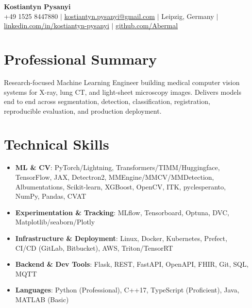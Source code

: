\documentclass[letterpaper,10pt]{article}
\newcommand{\resumeItem}[1]{
    \item\small{#1}\vspace{-0.5pt}
}
\newcommand{\resumeSubHeadingList}{\begin{itemize}[leftmargin=0.15in, label={}]\vspace{-2pt}}
\newcommand{\resumeSubHeadingListEnd}{\end{itemize}}
\begin{document}
\begin{center}
  \textbf{\Huge Kostiantyn Pysanyi}\vspace{4pt} \\
  \small +49 1525 8447880 $|$ \href{mailto:kostiantyn.pysanyi@gmail.com}{kostiantyn.pysanyi@gmail.com} $|$ Leipzig, Germany $|$
  \href{https://www.linkedin.com/in/kostiantyn-pysanyi/}{linkedin.com/in/kostiantyn-pysanyi} $|$ \href{https://github.com/Abermal}{github.com/Abermal}
\end{center}


\section{Professional Summary}
Research-focused Machine Learning Engineer building medical computer vision systems for X-ray, lung CT, and light-sheet microscopy images. Delivers models end to end across segmentation, detection, classification, registration, reproducible evaluation, and production deployment.

\section{Technical Skills}
\resumeSubHeadingList
  \resumeItem{\textbf{ML \& CV}: PyTorch/Lightning, Transformers/TIMM/Huggingface, TensorFlow, JAX, Detectron2, MMEngine/MMCV/MMDetection, Albumentations, Scikit-learn, XGBoost, OpenCV, ITK, pyclesperanto, NumPy, Pandas, CVAT}
  \resumeItem{\textbf{Experimentation \& Tracking}: MLflow, Tensorboard, Optuna, DVC, Matplotlib/seaborn/Plotly}
  \resumeItem{\textbf{Infrastructure \& Deployment}: Linux, Docker, Kubernetes, Prefect, CI/CD (GitLab, Bitbucket), AWS, Triton/TensorRT}
  \resumeItem{\textbf{Backend \& Dev Tools}: Flask, REST, FastAPI, OpenAPI, FHIR, Git, SQL, MQTT}
  \resumeItem{\textbf{Languages}: Python (Professional), C++17, TypeScript (Proficient), Java, MATLAB (Basic)}
\resumeSubHeadingListEnd
\end{document}
